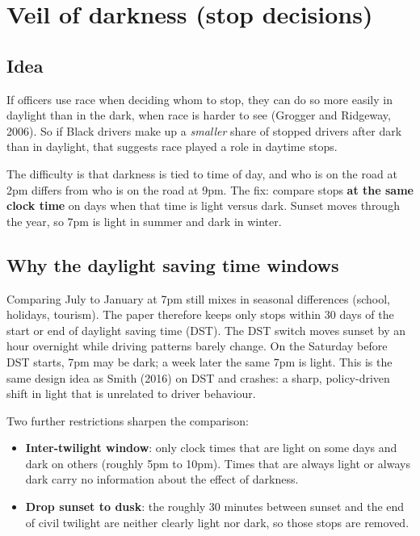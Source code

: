 \documentclass[11pt]{article}
\newcommand{\1}{\mathbf{1}}
\begin{document}
\section{Veil of darkness (stop decisions)}

\subsection{Idea}
If officers use race when deciding whom to stop, they can do so more easily in daylight than in the dark, when race is harder to see (Grogger and Ridgeway, 2006). So if Black drivers make up a \emph{smaller} share of stopped drivers after dark than in daylight, that suggests race played a role in daytime stops.

The difficulty is that darkness is tied to time of day, and who is on the road at 2pm differs from who is on the road at 9pm. The fix: compare stops \textbf{at the same clock time} on days when that time is light versus dark. Sunset moves through the year, so 7pm is light in summer and dark in winter.

\subsection{Why the daylight saving time windows}
Comparing July to January at 7pm still mixes in seasonal differences (school, holidays, tourism). The paper therefore keeps only stops within 30 days of the start or end of daylight saving time (DST). The DST switch moves sunset by an hour overnight while driving patterns barely change. On the Saturday before DST starts, 7pm may be dark; a week later the same 7pm is light. This is the same design idea as Smith (2016) on DST and crashes: a sharp, policy-driven shift in light that is unrelated to driver behaviour.

Two further restrictions sharpen the comparison:
\begin{itemize}
  \item \textbf{Inter-twilight window}: only clock times that are light on some days and dark on others (roughly 5pm to 10pm). Times that are always light or always dark carry no information about the effect of darkness.
  \item \textbf{Drop sunset to dusk}: the roughly 30 minutes between sunset and the end of civil twilight are neither clearly light nor dark, so those stops are removed.
\end{itemize}
\end{document}
